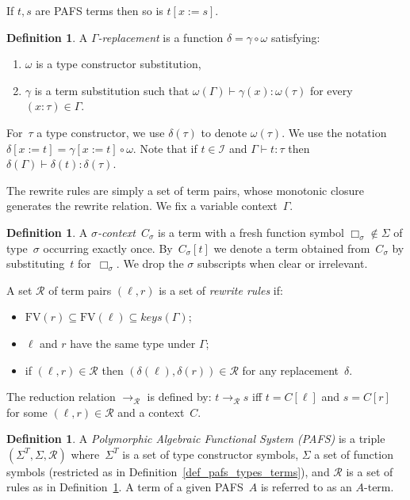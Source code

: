 \documentclass[a4paper,UKenglish,cleveref,autoref,numberwithinsect]{lipics-v2019}
\theoremstyle{definition}
\newtheorem{defn}[theorem]{Definition}
\newcommand{\Rules}{\mathcal{R}}
\newcommand{\Iterms}{\mathcal{I}}
\newcommand{\subst}[2]{#1:=#2}
\newcommand{\arr}[1]{\longrightarrow_{#1}}
\newcommand{\FV}{\mathrm{FV}}
\newcommand{\proves}{\vdash}
\begin{document}
\begin{lemma}
  If $t,s$ are PAFS terms then so is $t[\subst{x}{s}]$.
\end{lemma}

\begin{defn}\label{def_replacement}
  A \emph{$\Gamma$-replacement} is a function $\delta = \gamma \circ
  \omega$ satisfying:
  \begin{enumerate}
  \item $\omega$ is a type constructor substitution,
  \item $\gamma$ is a term substitution such that $\omega(\Gamma)
    \proves \gamma(x) : \omega(\tau)$ for every $(x : \tau) \in
    \Gamma$.
  \end{enumerate}

  For~$\tau$ a type constructor, we use $\delta(\tau)$ to denote
  $\omega(\tau)$. We use the notation $\delta[\subst{x}{t}] =
  \gamma[\subst{x}{t}] \circ \omega$. Note that if $t \in \Iterms$ and
  $\Gamma \proves t : \tau$ then $\delta(\Gamma) \proves \delta(t) :
  \delta(\tau)$.
\end{defn}

The rewrite rules are simply a set of term pairs, whose monotonic
closure generates the rewrite relation. We fix a variable
context~$\Gamma$.

\begin{defn}\label{def_rules}
  A \emph{$\sigma$-context}~$C_\sigma$ is a term with a fresh function
  symbol $\Box_\sigma \notin \Sigma$ of type~$\sigma$ occurring
  exactly once. By~$C_\sigma[t]$ we denote a term obtained
  from~$C_\sigma$ by substituting~$t$ for~$\Box_\sigma$. We drop the
  $\sigma$ subscripts when clear or irrelevant.

  A set $\Rules$ of term pairs $(\ell,r)$ is a set of \emph{rewrite
    rules} if:
  \begin{itemize}
  \item $\FV(r) \subseteq \FV(\ell) \subseteq \mathit{keys}(\Gamma)$;
  \item $\ell$ and $r$ have the same type under $\Gamma$;
  \item if $(\ell,r) \in \Rules$ then $(\delta(\ell),\delta(r)) \in
    \Rules$ for any replacement~$\delta$.
  \end{itemize}
  The reduction relation $\arr{\Rules}$ is defined by: $t \arr{\Rules}
  s$ iff $t = C[\ell]$ and $s = C[r]$ for some $(\ell,r)\in\Rules$ and
  a context~$C$.
\end{defn}

\begin{defn}\label{def_pafs}
  A \emph{Polymorphic Algebraic Functional System (PAFS)} is a triple
  $(\Sigma^T,\Sigma,\Rules)$ where~$\Sigma^T$ is a set of type
  constructor symbols, $\Sigma$ a set of function symbols (restricted
  as in Definition~\ref{def_pafs_types_terms}), and $\Rules$ is a set
  of rules as in Definition~\ref{def_rules}. A term of a given
  PAFS~$A$ is referred to as an $A$-term.
\end{defn}
\end{document}

